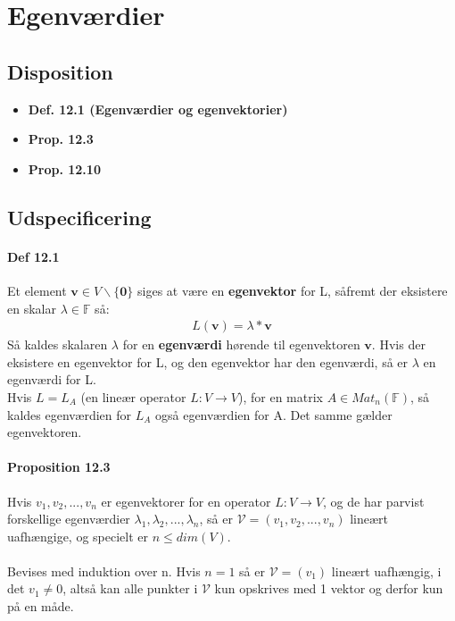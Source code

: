 \documentclass[paper=a4, fontsize=11pt]{scrartcl} %
\begin{document}
			
			
			\newpage
			
			\section{Egenværdier}
			
			\subsection{Disposition}
			
			\begin{itemize}
				\item \textbf{Def. 12.1 (Egenværdier og egenvektorier)}
				\item \textbf{Prop. 12.3}
				\item \textbf{Prop. 12.10}
			\end{itemize}
			
			
			\subsection{Udspecificering}
			
			
			\paragraph{Def 12.1} Et element $\mathbf{v}\in V\backslash \{\mathbf{0}\}$ siges at være en \textbf{egenvektor} for L, såfremt der eksistere en skalar $\lambda\in\mathbb{F}$ så:
			\begin{gather*}
			L(\mathbf{v})=\lambda*\mathbf{v}
			\end{gather*}
			Så kaldes skalaren $\lambda$ for en \textbf{egenværdi} hørende til egenvektoren $\mathbf{v}$. Hvis der eksistere en egenvektor for L, og den egenvektor har den egenværdi, så er $\lambda$ en egenværdi for L. \\
			Hvis $L=L_A$ (en lineær operator $L:V\rightarrow V$), for en matrix $A\in Mat_n(\mathbb{F})$, så kaldes egenværdien for $L_A$ også egenværdien for A. Det samme gælder egenvektoren.
			
			\paragraph{Proposition 12.3} Hvis $v_1,v_2,...,v_n$ er egenvektorer for en operator $L:V\rightarrow V$, og de har parvist forskellige egenværdier $\lambda_1, \lambda_2,...,\lambda_n$, så er $\mathcal{V}=(v_1,v_2,...,v_n)$ lineært uafhængige, og specielt er $n\leq dim(V)$. \\ \\
			Bevises med induktion over n. Hvis $n=1$ så er $\mathcal{V}=(v_1)$ lineært uafhængig, i det $v_1\neq0$, altså kan alle punkter i $\mathcal{V}$ kun opskrives med 1 vektor og derfor kun på en måde. \\ \\
			
\end{document}
